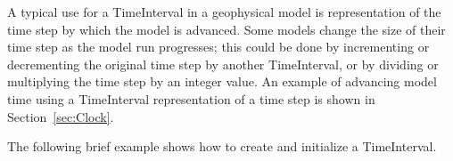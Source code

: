 
A typical use for a TimeInterval in a geophysical model 
is representation of the time step by which the model is 
advanced.  Some models change the size of their time step as 
the model run progresses; this could
be done by incrementing or decrementing the original time 
step by another TimeInterval, or by dividing or multiplying
the time step by an integer value.  An example of advancing 
model time using a TimeInterval representation of a time
step is shown in Section~\ref{sec:Clock}.

The following brief example shows how to create and initialize 
a TimeInterval.


